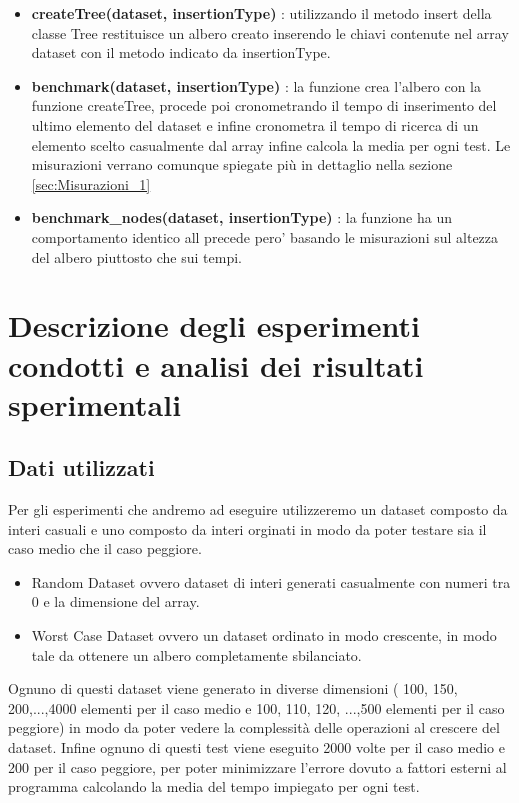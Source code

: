 \begin{itemize}
\begin{itemize}
        \item \textbf{createTree(dataset, insertionType)} : utilizzando il metodo insert della classe Tree restituisce un albero creato inserendo le chiavi contenute nel array dataset con il metodo
          indicato da insertionType.
        
        \item \textbf{benchmark(dataset, insertionType)} : la funzione crea l'albero con la funzione createTree, procede poi cronometrando il tempo di inserimento del ultimo elemento del dataset
          e infine cronometra il tempo di ricerca di un elemento scelto casualmente dal array infine calcola la media per ogni test. Le misurazioni verrano comunque spiegate più in dettaglio
          nella sezione \ref{sec:Misurazioni_1}

        \item \textbf{benchmark\_nodes(dataset, insertionType)} : la funzione ha un comportamento identico all precede pero' basando le misurazioni sul altezza del albero piuttosto che sui tempi.

    \end{itemize}
    
\end{itemize}

\newpage
\section{Descrizione degli esperimenti condotti e analisi dei risultati sperimentali}

\subsection{Dati utilizzati}
\label{sec:DatiUtilizzati_1}
Per gli esperimenti che andremo ad eseguire utilizzeremo un dataset composto da interi casuali e uno composto da interi orginati in modo da poter testare sia il caso medio che il caso peggiore. 
\begin{itemize}
  \item Random Dataset ovvero dataset di interi generati casualmente con numeri tra 0 e la dimensione del array.
  \item Worst Case Dataset ovvero un dataset ordinato in modo crescente, in modo tale da ottenere un albero completamente sbilanciato.
\end{itemize}

Ognuno di questi dataset viene generato in diverse dimensioni ( 100, 150, 200,...,4000 elementi per il caso medio e 100, 110, 120, ...,500 elementi per il caso peggiore) in modo da poter vedere
la complessità delle operazioni al crescere del dataset.
Infine ognuno di questi test viene eseguito 2000 volte per il caso medio e 200 per il caso peggiore, per poter minimizzare l'errore dovuto a fattori esterni al programma calcolando la media del tempo impiegato per ogni test.

